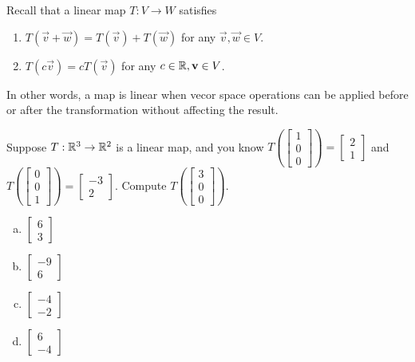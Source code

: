 \begin{applicationActivities}

\begin{remark}
Recall that a linear map \(T:V\rightarrow W\)
satisfies
\begin{enumerate}
\item \(T(\vec{v}+\vec{w}) = T(\vec{v})+T(\vec{w})\)
      for any \(\vec{v},\vec{w} \in V\).
\item \(T(c\vec{v}) = cT(\vec{v})\)
      for any \(c \in \mathbb{R},\mathbf{v} \in V\).
\end{enumerate}
In other words, a map is linear when vecor space operations
can be applied before or after the transformation without affecting the result.
\end{remark}

\begin{activity}{5}
Suppose \(T: \mathbb{R}^3 \rightarrow \mathbb{R}^2\) is a linear map, and you know
\(
  T\left(\begin{bmatrix} 1 \\ 0 \\ 0 \end{bmatrix} \right)
=
  \begin{bmatrix} 2 \\ 1 \end{bmatrix}
\)
and
\(
  T\left(\begin{bmatrix} 0 \\ 0 \\ 1 \end{bmatrix} \right)
=
  \begin{bmatrix} -3 \\ 2 \end{bmatrix}
\).
Compute \(T\left(\begin{bmatrix} 3 \\ 0 \\ 0 \end{bmatrix}\right)\).
\begin{multicols}{2}
\begin{enumerate}[(a)]
\item \(\begin{bmatrix} 6 \\ 3\end{bmatrix}\)
\item \(\begin{bmatrix} -9 \\ 6 \end{bmatrix}\)
\item \(\begin{bmatrix} -4 \\ -2 \end{bmatrix}\)
\item \(\begin{bmatrix} 6 \\ -4 \end{bmatrix}\)
\end{enumerate}
\end{multicols}
\end{activity}


\end{applicationActivities}
